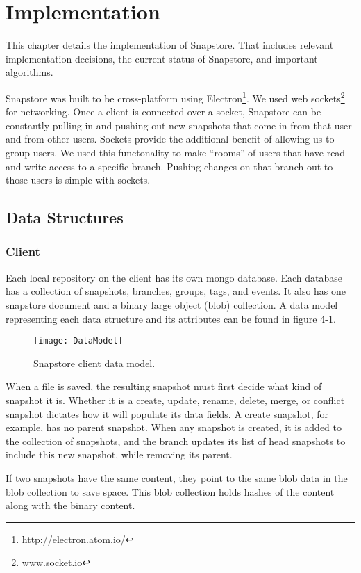 \chapter{Implementation}

This chapter details the implementation of Snapstore. That includes relevant implementation decisions, the current status of Snapstore, and important algorithms. 

Snapstore was built to be cross-platform using Electron\footnote{http://electron.atom.io/}. We used web sockets\footnote{www.socket.io} for networking. Once a client is connected over a socket, Snapstore can be constantly pulling in and pushing out new snapshots that come in from that user and from other users. Sockets provide the additional benefit of allowing us to group users. We used this functonality to make ``rooms'' of users that have read and write access to a specific branch. Pushing changes on that branch out to those users is simple with sockets.

\section{Data Structures}

\subsection{Client}

Each local repository on the client has its own mongo database. Each database has a collection of snapshots, branches, groups, tags, and events. It also has one snapstore document and a binary large object (blob) collection. A data model representing each data structure and its attributes can be found in figure 4-1.

\begin{figure}
\texttt{[image: DataModel]}
\caption{Snapstore client data model.}
\label{arm:fig1}
\end{figure}

When a file is saved, the resulting snapshot must first decide what kind of snapshot it is. Whether it is a create, update, rename, delete, merge, or conflict snapshot dictates how it will populate its data fields. A create snapshot, for example, has no parent snapshot. When any snapshot is created, it is added to the collection of snapshots, and the branch updates its list of head snapshots to include this new snapshot, while removing its parent.

If two snapshots have the same content, they point to the same blob data in the blob collection to save space. This blob collection holds hashes of the content along with the binary content.

